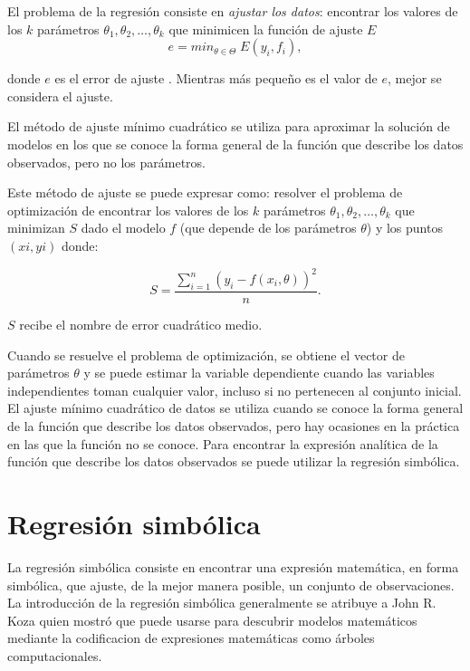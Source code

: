 El problema de la regresión consiste en \textit{ajustar los datos}: encontrar los valores de los $k$ parámetros $\theta_1, \theta_2, \dots, \theta_k$ que minimicen la función de ajuste $E$
\begin{equation*}
    e = min_{\theta \in \Theta} \; E(y_i, f_i),
\end{equation*}

donde $e$ es el error de ajuste \cite{statisticintroductions}. Mientras más pequeño es el valor de $e$, mejor se considera el ajuste.

El método de ajuste mínimo cuadrático se utiliza para aproximar la solución de modelos en los que se conoce la forma general de la función que describe los datos observados, pero no los parámetros.

Este método de ajuste se puede expresar como: resolver el problema de optimización de encontrar los valores de los $k$ parámetros $\theta_1, \theta_2, \dots, \theta_k$ que minimizan $S$ dado el modelo $f$ (que depende de los parámetros $\theta$) y los puntos $(xi, yi)$ donde:

$$S = \frac{\sum_{i=1}^{n}(y_i - f(x_i, \theta))^2}{n}.$$

$S$ recibe el nombre de error cuadrático medio.

Cuando se resuelve el problema de optimización, se obtiene el vector de parámetros $\theta$ y se puede estimar la variable dependiente cuando las variables independientes toman cualquier valor, incluso si no pertenecen al conjunto inicial. El ajuste mínimo cuadrático de datos se utiliza cuando se conoce la forma general de la función que describe los datos observados, pero hay ocasiones en la práctica en las que la función no se conoce. Para encontrar la expresión analítica de la función que describe los datos observados se puede utilizar la regresión simbólica.

\section{Regresión simbólica}\label{section:symbolic_regression}

La regresión simbólica consiste en encontrar una expresión matemática, en forma simbólica, que ajuste, de la mejor manera posible, un conjunto de observaciones. La introducción de la regresión simbólica generalmente se atribuye a John R. Koza \cite{zelinka2005analytic} quien mostró que puede usarse para descubrir modelos matemáticos mediante la codificacion de expresiones matemáticas como árboles computacionales.

